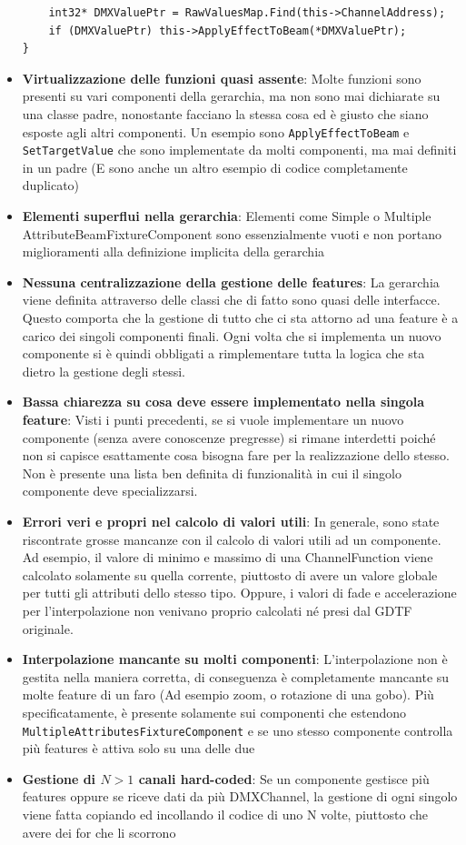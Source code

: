 \documentclass[main.tex]{subfiles}
\begin{document}
\begin{itemize}
\begin{lstlisting}
	int32* DMXValuePtr = RawValuesMap.Find(this->ChannelAddress);
	if (DMXValuePtr) this->ApplyEffectToBeam(*DMXValuePtr);
}
\end{lstlisting}
    \item \textbf{Virtualizzazione delle funzioni quasi assente}: Molte funzioni sono presenti su vari componenti della gerarchia, ma non sono mai dichiarate su una classe padre, nonostante facciano la stessa cosa ed è giusto che siano esposte agli altri componenti. Un esempio sono \lstinline{ApplyEffectToBeam} e \lstinline{SetTargetValue} che sono implementate da molti componenti, ma mai definiti in un padre (E sono anche un altro esempio di codice completamente duplicato) 
    \item \textbf{Elementi superflui nella gerarchia}: Elementi come Simple o Multiple AttributeBeamFixtureComponent sono essenzialmente vuoti e non portano miglioramenti alla definizione implicita della gerarchia %
    \item \textbf{Nessuna centralizzazione della gestione delle features}: La gerarchia viene definita attraverso delle classi che di fatto sono quasi delle interfacce. Questo comporta che la gestione di tutto che ci sta attorno ad una feature è a carico dei singoli componenti finali. Ogni volta che si implementa un nuovo componente si è quindi obbligati a rimplementare tutta la logica che sta dietro la gestione degli stessi.
    \item \textbf{Bassa chiarezza su cosa deve essere implementato nella singola feature}: Visti i punti precedenti, se si vuole implementare un nuovo componente (senza avere conoscenze pregresse) si rimane interdetti poiché non si capisce esattamente cosa bisogna fare per la realizzazione dello stesso. Non è presente una lista ben definita di funzionalità in cui il singolo componente deve specializzarsi.
    \item \textbf{Errori veri e propri nel calcolo di valori utili}: In generale, sono state riscontrate grosse mancanze con il calcolo di valori utili ad un componente. Ad esempio, il valore di minimo e massimo di una ChannelFunction viene calcolato solamente su quella corrente, piuttosto di avere un valore globale per tutti gli attributi dello stesso tipo. Oppure, i valori di fade e accelerazione per l'interpolazione non venivano proprio calcolati né presi dal GDTF originale.
    \item \textbf{Interpolazione mancante su molti componenti}: L'interpolazione non è gestita nella maniera corretta, di conseguenza è completamente mancante su molte feature di un faro (Ad esempio zoom, o rotazione di una gobo). Più specificatamente, è presente solamente sui componenti che estendono \lstinline{MultipleAttributesFixtureComponent} e se uno stesso componente controlla più features è attiva solo su una delle due
    \item \textbf{Gestione di $N > 1$ canali hard-coded}: Se un componente gestisce più features oppure se riceve dati da più DMXChannel, la gestione di ogni singolo viene fatta copiando ed incollando il codice di uno N volte, piuttosto che avere dei for che li scorrono
\end{itemize}
\end{document}
